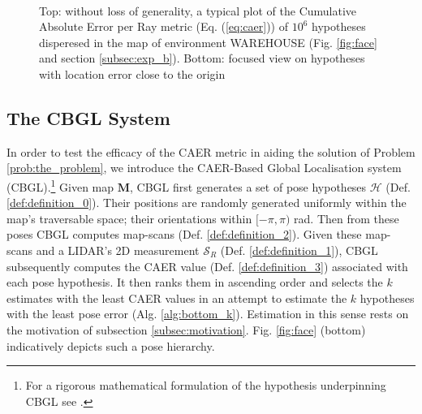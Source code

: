 \begin{figure}\vspace{-1.5cm}
  \subfloat{\hspace{0.5cm}}\vspace{-1.5cm}\\
  \subfloat{\hspace{-0.3cm}}
  \caption{\small Top: without loss of generality, a typical plot of the
           Cumulative Absolute Error per Ray metric (Eq. (\ref{eq:caer})) of
           $10^6$ hypotheses disperesed in the map of environment WAREHOUSE
           (Fig. \ref{fig:face} and section \ref{subsec:exp_b}). Bottom:
           focused view on hypotheses with location error close to the origin}
  \vspace{-0.5cm}
  \label{fig:motivation_caer}
\end{figure}

\subsection{The CBGL System}

In order to test the efficacy of the CAER metric in aiding the solution of
Problem \ref{prob:the_problem}, we introduce the CAER-Based Global Localisation
system (CBGL).\footnote{For a rigorous mathematical formulation of the
hypothesis underpinning CBGL see \cite{cbglarxiv}.} Given map $\bm{M}$, CBGL
first generates a set of pose hypotheses $\mathcal{H}$ (Def.
\ref{def:definition_0}). Their positions are randomly generated
uniformly within the map's traversable space; their orientations within
$[-\pi,\pi)$ rad. Then from these poses CBGL computes map-scans (Def.
\ref{def:definition_2}). Given these map-scans and a LIDAR's 2D measurement
$\mathcal{S}_R$ (Def. \ref{def:definition_1}), CBGL subsequently computes the
CAER value (Def. \ref{def:definition_3}) associated with each pose hypothesis.
It then ranks them in ascending order and selects the $k$ estimates with the
least CAER values in an attempt to estimate the $k$ hypotheses with the least
pose error (Alg. \ref{alg:bottom_k}). Estimation in this sense rests on the
motivation of subsection \ref{subsec:motivation}. Fig. \ref{fig:face} (bottom)
indicatively depicts such a pose hierarchy.

